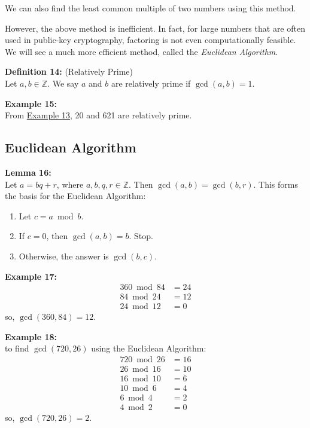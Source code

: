 \documentclass[12pt]{article}
\begin{document}
We can also find the least common multiple of two numbers using this method.  

However, the above method is inefficient. In fact, for large numbers that are often used in public-key cryptography, factoring is not even computationally feasible. We will see a much more efficient method, called the \emph{Euclidean Algorithm}.



\vspace{5mm}

\noindent\textbf{Definition 14:} (Relatively Prime)
\label{def:relprime}
\\Let $a,b \in \mathbb{Z}$. We say $a$ and $b$ are relatively prime if $\gcd(a,b) = 1$.

\vspace{5mm}

\noindent\textbf{Example 15:}
\label{ex:relprime}
\\From \hyperref[ex:primefact]{Example 13}, 20 and 621 are relatively prime.

\vspace{15mm}

\subsection{Euclidean Algorithm}

\noindent\textbf{Lemma 16:}
\label{lem:euclid}
\\Let $a=bq+r$, where $a,b,q,r \in \mathbb{Z}$. Then $\gcd(a,b) = \gcd(b,r)$.
This forms the basis for the Euclidean Algorithm:

\begin{enumerate}
    \item Let $c = a \bmod b$.
    \item If $c = 0$, then $\gcd(a,b) = b$. Stop.
    \item Otherwise, the answer is $\gcd(b,c)$.
\end{enumerate}


\noindent\textbf{Example 17:}
\label{ex:euclid360}
\begin{align*}
360 \bmod 84 &= 24 \\
84 \bmod 24 &= 12 \\
24 \bmod 12 &= 0
\end{align*}
so, $\gcd(360,84) = 12$.

\vspace{5mm}

\noindent\textbf{Example 18:}
\label{ex:euclid720}
\\to find $\gcd(720,26)$ using the Euclidean Algorithm:
\begin{align*}
720 \bmod 26 &= 16 \\   
26 \bmod 16 &= 10 \\
16 \bmod 10 &= 6 \\
10 \bmod 6 &= 4 \\
6 \bmod 4 &= 2 \\
4 \bmod 2 &= 0
\end{align*}
so, $\gcd(720,26) = 2$.
\end{document}
